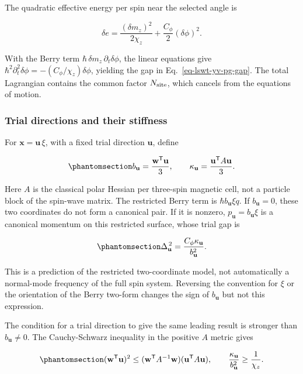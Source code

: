 The quadratic effective energy per spin near the selected angle is

\[
\delta e=\frac{(\delta m_z)^2}{2\chi_z}
+\frac{C_\phi}{2}(\delta\phi)^2.
\]

With the Berry term \(\hbar\,\delta m_z\,\partial_t\delta\phi\), the
linear equations give
\(\hbar^2\partial_t^2\delta\phi=-(C_\phi/\chi_z)\delta\phi\), yielding
the gap in Eq.~\ref{eq-lswt-yv-pg-gap}. The total Lagrangian contains
the common factor \(N_{\rm site}\), which cancels from the equations of
motion.

\subsubsection{Trial directions and their
stiffness}\label{trial-directions-and-their-stiffness}

For \(\mathbf x=\mathbf u\,\xi\), with a fixed trial direction
\(\mathbf u\), define

\begin{equation}\phantomsection\label{eq-lswt-yv-pg-trial-coordinates}{
b_{\mathbf u}=\frac{\mathbf w^{\mathsf T}\mathbf u}{3},
\qquad
\kappa_{\mathbf u}=\frac{\mathbf u^{\mathsf T}A\mathbf u}{3}.
}\end{equation}

Here \(A\) is the classical polar Hessian per three-spin magnetic cell,
not a particle block of the spin-wave matrix. The restricted Berry term
is \(\hbar b_{\mathbf u}\xi\dot q\). If \(b_{\mathbf u}=0\), these two
coordinates do not form a canonical pair. If it is nonzero,
\(p_{\mathbf u}=b_{\mathbf u}\xi\) is a canonical momentum on this
restricted surface, whose trial gap is

\begin{equation}\phantomsection\label{eq-lswt-yv-pg-trial-gap}{
\Delta_{\mathbf u}^{\,2}
=\frac{C_\phi\kappa_{\mathbf u}}{b_{\mathbf u}^{2}}.
}\end{equation}

This is a prediction of the restricted two-coordinate model, not
automatically a normal-mode frequency of the full spin system. Reversing
the convention for \(\xi\) or the orientation of the Berry two-form
changes the sign of \(b_{\mathbf u}\) but not this expression.

The condition for a trial direction to give the same leading result is
stronger than \(b_{\mathbf u}\ne0\). The Cauchy-Schwarz inequality in
the positive \(A\) metric gives

\begin{equation}\phantomsection\label{eq-lswt-yv-pg-stiffness-bound}{
(\mathbf w^{\mathsf T}\mathbf u)^2
\le (\mathbf w^{\mathsf T}A^{-1}\mathbf w)
   (\mathbf u^{\mathsf T}A\mathbf u),
\qquad
\frac{\kappa_{\mathbf u}}{b_{\mathbf u}^{2}}
\ge\frac{1}{\chi_z}.
}\end{equation}

